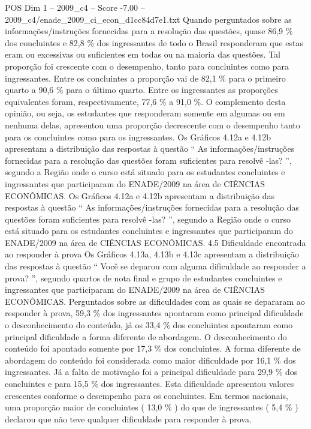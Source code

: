 \begin{textsample}{POS Dim 1 – 2009\_c4 – Score -7.00 – 2009\_c4/enade\_2009\_ci\_econ\_d1cc84d7e1.txt}
Quando perguntados sobre as informações/instruções fornecidas para a resolução das questões, quase 86,9 \% dos concluintes e 82,8 \% dos ingressantes de todo o Brasil responderam que estas eram ou excessivas ou suficientes em todas ou na maioria das questões.
Tal proporção foi crescente com o desempenho, tanto para concluintes como para ingressantes.
Entre os concluintes a proporção vai de 82,1 \% para o primeiro quarto a 90,6 \% para o último quarto.
Entre os ingressantes as proporções equivalentes foram, respectivamente, 77,6 \% a 91,0 \%.
O complemento desta opinião, ou seja, os estudantes que responderam somente em algumas ou em nenhuma delas, apresentou uma proporção decrescente com o desempenho tanto para os concluintes como para os ingressantes.
Os Gráficos 4.12a e 4.12b apresentam a distribuição das respostas à questão “ As informações/instruções fornecidas para a resolução das questões foram suficientes para resolvê -las? ”, segundo a Região onde o curso está situado para os estudantes concluintes e ingressantes que participaram do ENADE/2009 na área de CIÊNCIAS ECONÔMICAS.
Os Gráficos 4.12a e 4.12b apresentam a distribuição das respostas à questão “ As informações/instruções fornecidas para a resolução das questões foram suficientes para resolvê -las? ”, segundo a Região onde o curso está situado para os estudantes concluintes e ingressantes que participaram do ENADE/2009 na área de CIÊNCIAS ECONÔMICAS. 4.5 Dificuldade encontrada ao responder à prova Os Gráficos 4.13a, 4.13b e 4.13c apresentam a distribuição das respostas à questão “ Você se deparou com alguma dificuldade ao responder a prova? ”, segundo quartos de nota final e grupo de estudantes concluintes e ingressantes que participaram do ENADE/2009 na área de CIÊNCIAS ECONÔMICAS.
Perguntados sobre as dificuldades com as quais se depararam ao responder à prova, 59,3 \% dos ingressantes apontaram como principal dificuldade o desconhecimento do conteúdo, já os 33,4 \% dos concluintes apontaram como principal dificuldade a forma diferente de abordagem.
O desconhecimento do conteúdo foi apontado somente por 17,3 \% dos concluintes.
A forma diferente de abordagem do conteúdo foi considerada como maior dificuldade por 16,1 \% dos ingressantes.
Já a falta de motivação foi a principal dificuldade para 29,9 \% dos concluintes e para 15,5 \% dos ingressantes.
Esta dificuldade apresentou valores crescentes conforme o desempenho para os concluintes.
Em termos nacionais, uma proporção maior de concluintes ( 13,0 \% ) do que de ingressantes ( 5,4 \% ) declarou que não teve qualquer dificuldade para responder à prova.

\end{textsample}
